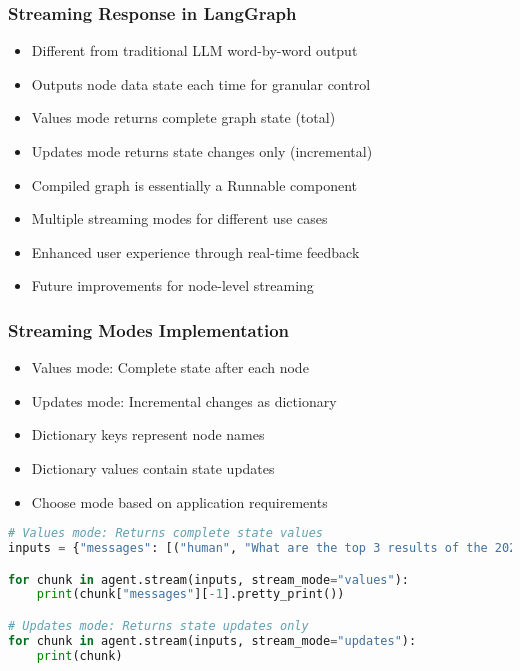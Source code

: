 \begin{frame}[fragile]\frametitle{Streaming Response in LangGraph}
      \begin{itemize}
        \item Different from traditional LLM word-by-word output
        \item Outputs node data state each time for granular control
        \item Values mode returns complete graph state (total)
        \item Updates mode returns state changes only (incremental)
        \item Compiled graph is essentially a Runnable component
        \item Multiple streaming modes for different use cases
        \item Enhanced user experience through real-time feedback
        \item Future improvements for node-level streaming
      \end{itemize}
\end{frame}

\begin{frame}[fragile]\frametitle{Streaming Modes Implementation}
      \begin{itemize}
        \item Values mode: Complete state after each node
        \item Updates mode: Incremental changes as dictionary
        \item Dictionary keys represent node names
        \item Dictionary values contain state updates
        \item Choose mode based on application requirements
      \end{itemize}
      \begin{lstlisting}[language=Python, basicstyle=\small]
# Values mode: Returns complete state values
inputs = {"messages": [("human", "What are the top 3 results of the 2024 Beijing Half Marathon?")]}

for chunk in agent.stream(inputs, stream_mode="values"):
    print(chunk["messages"][-1].pretty_print())

# Updates mode: Returns state updates only
for chunk in agent.stream(inputs, stream_mode="updates"):
    print(chunk)
      \end{lstlisting}

\end{frame}
